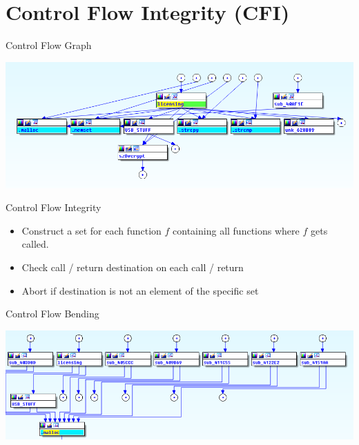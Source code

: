 \documentclass[beamer]{uibk}
\begin{document}
\section{Control Flow Integrity (CFI)}

\begin{frame}{Control Flow Graph}
    \begin{center}
        \includegraphics[width=\textwidth]{gfx/unraid_part_graph.png}
    \end{center}
\end{frame}

\begin{frame}{Control Flow Integrity}
    \begin{itemize}
        \item Construct a set for each function $f$ containing all functions
            where $f$ gets called.
        \bigskip
        \item Check call / return destination on each call / return
        \medskip
        \item Abort if destination is not an element of the specific set
    \end{itemize}
\end{frame}

\begin{frame}{Control Flow Bending}
    \begin{center}
        \includegraphics[width=\textwidth]{gfx/unraid_part_graph_malloc.png}
    \end{center}
\end{frame}
\end{document}
